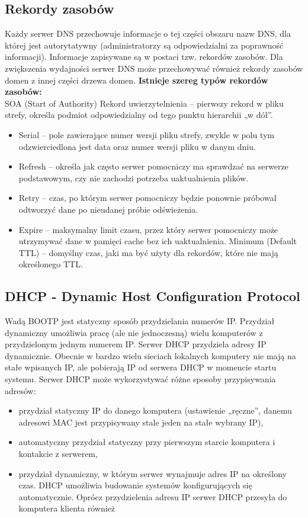 \documentclass[../main.tex]{subfiles}
\begin{document}
    \subsection{Rekordy zasobów}
    Każdy serwer DNS przechowuje informacje o tej części obszaru nazw DNS, dla której jest
    autorytatywny (administratorzy są odpowiedzialni za poprawność informacji). Informacje
    zapisywane są w postaci tzw. rekordów zasobów.
    Dla zwiększenia wydajności serwer DNS może przechowywać również rekordy zasobów
    domen z innej części drzewa domen.
    \textbf{Istnieje szereg typów rekordów zasobów:}\\
    SOA (Start of Authority) Rekord uwierzytelnienia – pierwszy rekord w pliku
    strefy, określa podmiot odpowiedzialny od tego punktu hierarchii „w dół”.
    \begin{itemize}
        \item Serial – pole zawierające numer wersji pliku strefy, zwykle w polu tym odzwierciedlona jest
        data oraz numer wersji pliku w danym dniu.
        \item Refresh – określa jak często serwer pomocniczy ma sprawdzać na serwerze podstawowym,
        czy nie zachodzi potrzeba uaktualnienia plików.
        \item Retry – czas, po którym serwer pomocniczy będzie ponownie próbował odtworzyć dane po
        nieudanej próbie odświeżenia.
        \item Expire – maksymalny limit czasu, przez który serwer pomocniczy może utrzymywać dane w
        pamięci cache bez ich uaktualnienia.
        Minimum (Default TTL) – domyślny czas, jaki ma być użyty dla rekordów, które nie mają
        określonego TTL.
    \end{itemize}

    \subsection{DHCP - Dynamic Host Configuration Protocol}
    Wadą BOOTP jest statyczny sposób przydzielania numerów IP.
    Przydział dynamiczny umożliwia pracę (ale nie jednoczesną) wielu komputerów z
    przydzielonym jednym numerem IP.
    Serwer DHCP przydziela adresy IP dynamicznie. Obecnie w bardzo wielu sieciach lokalnych
    komputery nie mają na stałe wpisanych IP, ale pobierają IP od serwera DHCP w momencie
    startu systemu.
    Serwer DHCP może wykorzystywać różne sposoby przypisywania adresów:
    \begin{itemize}
        \item przydział statyczny IP do danego komputera (ustawienie „ręczne”, danemu adresowi
        MAC jest przypisywany stale jeden na stałe wybrany IP),
        \item automatyczny przydział statyczny przy pierwszym starcie komputera i kontakcie z
        serwerem,
        \item przydział dynamiczny, w którym serwer wynajmuje adres IP na określony czas.
        DHCP umożliwia budowanie systemów konfigurujących się automatycznie.
        Oprócz przydzielenia adresu IP serwer DHCP przesyła do komputera klienta również
    \end{itemize}
\end{document}
